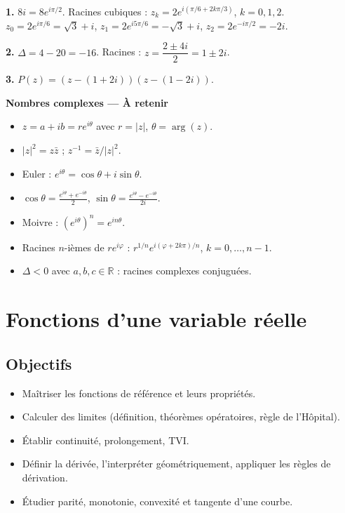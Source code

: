 \documentclass[11pt,a4paper,twoside]{book}
\newcommand{\R}{\mathbb{R}}
\begin{document}
\begin{correctionbox}[Correction]
\textbf{1.} $8i = 8e^{i\pi/2}$. Racines cubiques : $z_k = 2e^{i(\pi/6+2k\pi/3)}$, $k=0,1,2$.
$z_0 = 2e^{i\pi/6} = \sqrt{3}+i$,\; $z_1 = 2e^{i5\pi/6} = -\sqrt{3}+i$,\; $z_2 = 2e^{-i\pi/2} = -2i$.

\textbf{2.} $\Delta = 4-20 = -16$. Racines : $z = \dfrac{2 \pm 4i}{2} = 1 \pm 2i$.

\textbf{3.} $P(z) = (z-(1+2i))(z-(1-2i))$.
\end{correctionbox}

\begin{retenirbox}
\textbf{Nombres complexes — À retenir}
\begin{itemize}
  \item $z = a+ib = re^{i\theta}$ avec $r=|z|$, $\theta=\arg(z)$.
  \item $|z|^2 = z\bar{z}$ ; $z^{-1} = \bar{z}/|z|^2$.
  \item Euler : $e^{i\theta} = \cos\theta + i\sin\theta$.
  \item $\cos\theta = \frac{e^{i\theta}+e^{-i\theta}}{2}$, $\sin\theta = \frac{e^{i\theta}-e^{-i\theta}}{2i}$.
  \item Moivre : $(e^{i\theta})^n = e^{in\theta}$.
  \item Racines $n$-ièmes de $re^{i\varphi}$ : $r^{1/n}e^{i(\varphi+2k\pi)/n}$, $k=0,\ldots,n-1$.
  \item $\Delta < 0$ avec $a,b,c \in \R$ : racines complexes conjuguées.
\end{itemize}
\end{retenirbox}

\chapter{Fonctions d'une variable réelle}

\section*{Objectifs}
\begin{itemize}[leftmargin=1.5em]
  \item Maîtriser les fonctions de référence et leurs propriétés.
  \item Calculer des limites (définition, théorèmes opératoires, règle de l'Hôpital).
  \item Établir continuité, prolongement, TVI.
  \item Définir la dérivée, l'interpréter géométriquement, appliquer les règles de dérivation.
  \item Étudier parité, monotonie, convexité et tangente d'une courbe.
\end{itemize}
\end{document}
